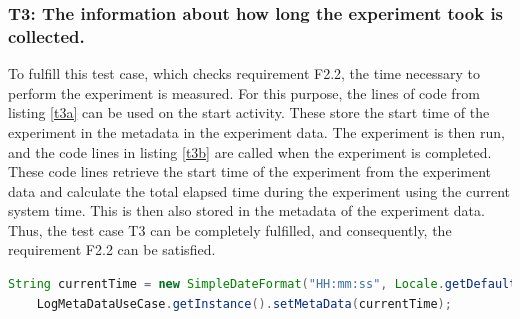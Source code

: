 \newpage



\subsubsection*{T3: The information about how long the experiment took is collected.}

To fulfill this test case, which checks requirement F2.2, the time necessary to perform the experiment is measured. For this purpose, the lines of code from listing \ref{t3a} can be used on the start activity. These store the start time of the experiment in the metadata in the experiment data. The experiment is then run, and the code lines in listing \ref{t3b} are called when the experiment is completed. These code lines retrieve the start time of the experiment from the experiment data and calculate the total elapsed time during the experiment using the current system time. This is then also stored in the metadata of the experiment data. Thus, the test case T3 can be completely fulfilled, and consequently, the requirement F2.2 can be satisfied.

\vspace{0.5cm}

\begin{lstlisting}[language=java,label=t3a,lineskip={0pt}, caption=T3: Collecting the Time Needed to Conduct an Experiment (a), basicstyle=\scriptsize, captionpos=b]
    String currentTime = new SimpleDateFormat("HH:mm:ss", Locale.getDefault()).format(new Date());
    LogMetaDataUseCase.getInstance().setMetaData(currentTime);
\end{lstlisting}

